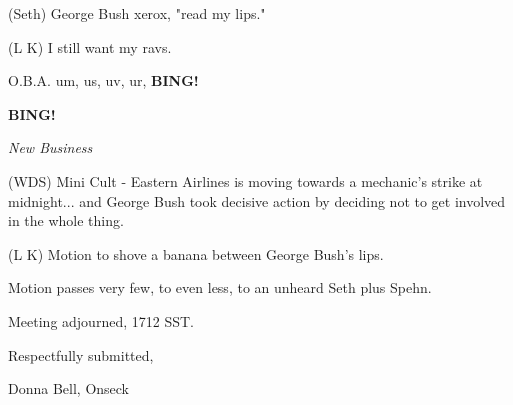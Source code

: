 \documentclass[12pt]{article}
\newcommand{\bing}{{\bf BING!} }
\newcommand{\goto}[1]{\bing \vskip 12pt \centerline{{\em{#1}}}}
\begin{document}
(Seth) George Bush xerox, "read my lips."

(L K) I still want my ravs.

O.B.A. um, us, uv, ur, \bing

\goto{New Business}

(WDS) Mini Cult - Eastern Airlines is moving towards a mechanic's strike at midnight... and George Bush took decisive action by deciding not to get involved in the whole thing.

(L K) Motion to shove a banana between George Bush's lips.

Motion passes very few, to even less, to an unheard Seth plus Spehn.

\vspace{12pt}

\noindent
Meeting adjourned, 1712 SST.

\vspace{18pt}

\centerline{Respectfully submitted,}
\centerline{Donna Bell, Onseck}
\end{document}
